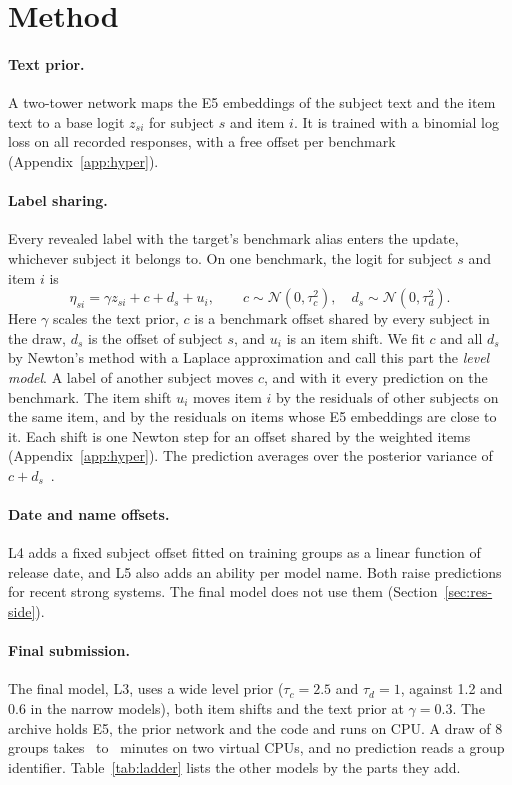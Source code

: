 \documentclass{article}
\begin{document}
\section{Method}
\label{sec:method}
\paragraph{Text prior.}
A two-tower network maps the E5 embeddings of the subject text and the item text to a base logit $z_{si}$ for subject $s$ and item $i$.
It is trained with a binomial log loss on all recorded responses, with a free offset per benchmark (Appendix~\ref{app:hyper}).

\paragraph{Label sharing.}
\label{sec:adapt}
Every revealed label with the target's benchmark alias enters the update, whichever subject it belongs to.
On one benchmark, the logit for subject $s$ and item $i$ is
\begin{equation}
\eta_{si} = \gamma z_{si} + c + d_s + u_i, \qquad c\sim\mathcal N(0,\tau_c^2), \quad d_s\sim\mathcal N(0,\tau_d^2).
\label{eq:level}
\end{equation}
Here $\gamma$ scales the text prior, $c$ is a benchmark offset shared by every subject in the draw, $d_s$ is the offset of subject $s$, and $u_i$ is an item shift.
We fit $c$ and all $d_s$ by Newton's method with a Laplace approximation and call this part the \emph{level model}.
A label of another subject moves $c$, and with it every prediction on the benchmark.
The item shift $u_i$ moves item $i$ by the residuals of other subjects on the same item, and by the residuals on items whose E5 embeddings are close to it.
Each shift is one Newton step for an offset shared by the weighted items (Appendix~\ref{app:hyper}).
The prediction averages over the posterior variance of $c+d_s$~\citep{mackay}.

\paragraph{Date and name offsets.}
\label{sec:datename}
L4 adds a fixed subject offset fitted on training groups as a linear function of release date, and L5 also adds an ability per model name.
Both raise predictions for recent strong systems.
The final model does not use them (Section~\ref{sec:res-side}).

\paragraph{Final submission.}
\label{sec:final}
The final model, L3, uses a wide level prior ($\tau_c=2.5$ and $\tau_d=1$, against 1.2 and 0.6 in the narrow models), both item shifts and the text prior at $\gamma=0.3$.
The archive holds E5, the prior network and the code and runs on CPU.
A draw of 8 groups takes \EncDrawMinLo\ to \EncDrawMinHi\ minutes on two virtual CPUs, and no prediction reads a group identifier.
Table~\ref{tab:ladder} lists the other models by the parts they add.
\end{document}
